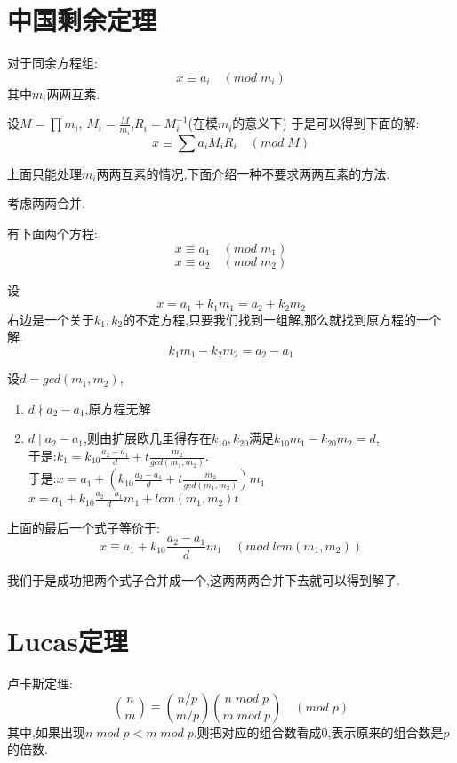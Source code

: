 \documentclass{beamer}
\begin{document}
	\section{中国剩余定理}
		\begin{frame}
			对于同余方程组:
			$$
				x \equiv a_i \quad  ( mod \; m_i)
			$$
			其中$m_i$两两互素.
			
			设$M = \prod m_i$, $M_i = \frac{M}{m_i}$,$R_i = M_{i}^{-1}$(在模$m_i$的意义下)
			于是可以得到下面的解:
			$$
			x \equiv \sum a_i M_i R_i \quad ( mod \; M )
			$$
		\end{frame}
		\begin{frame}
			上面只能处理$m_i$两两互素的情况,下面介绍一种不要求两两互素的方法.
			
			考虑两两合并.
			
			有下面两个方程:
			$$
				x \equiv a_1 \quad (mod \; m_1)
			$$
			$$
				x \equiv a_2 \quad (mod \; m_2)
			$$
		\end{frame}
		\begin{frame}
			设
			$$
				x = a_1 + k_1m_1 = a_2 + k_2m_2
			$$
			右边是一个关于$k_1,k_2$的不定方程,只要我们找到一组解,那么就找到原方程的一个解.
			$$
				k_1m_1 - k_2m_2 = a_2 - a_1
			$$
			
			\pause
			
			设$d = gcd(m_1,m_2)$,
			\begin{enumerate}
				\item $d \nmid a_2 - a_1$,原方程无解 \pause
				\item $d \mid a_2 - a_1$,则由扩展欧几里得存在$k_{10},k_{20}$满足$k_{10}m_1 - k_{20}m_2 = d$,\\ \pause
								于是:$k_1 = k_{10}  \frac{a_2 - a_1}{d} + t \frac{m_2}{gcd(m_1,m_2)}.$\\ \pause
								于是:$x = a_1 + (k_{10}  \frac{a_2 - a_1}{d} + t \frac{m_2}{gcd(m_1,m_2)})m_1$ \\ \pause
								$x = a_1 + k_{10}\frac{a_2-a_1}{d}m_1 + lcm(m_1,m_2)t$
			\end{enumerate}
		\end{frame}
		\begin{frame}
			上面的最后一个式子等价于:
			$$
				x \equiv a_1 + k_{10}\frac{a_2-a_1}{d}m_1 \quad (mod \;lcm(m_1,m_2))
			$$
			
			\pause
			
			我们于是成功把两个式子合并成一个,这两两两合并下去就可以得到解了.
		\end{frame}
	\section{Lucas定理}
		\begin{frame}
			卢卡斯定理:
			$$
				\binom{n}{m} \equiv \binom{n/p}{m/p}\binom{n \; mod \; p}{m \; mod \; p} \quad (mod \; p)
			$$
			其中,如果出现$n \; mod \; p < m \; mod \; p$,则把对应的组合数看成$0$,表示原来的组合数是$p$的倍数.
		\end{frame}
\end{document}
